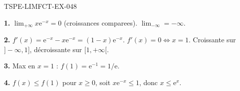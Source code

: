 \begin{corrige}{TSPE-LIMFCT-EX-048}

\textbf{1.} $\lim_{+\infty} x\mathrm{e}^{-x} = 0$ (croissances comparees). $\lim_{-\infty} = -\infty$.

\textbf{2.} $f'(x) = \mathrm{e}^{-x} - x\mathrm{e}^{-x} = (1-x)\mathrm{e}^{-x}$. $f'(x) = 0 \iff x = 1$. Croissante sur $]-\infty, 1]$, décroissante sur $[1, +\infty[$.

\textbf{3.} Max en $x = 1$ : $f(1) = \mathrm{e}^{-1} = 1/\mathrm{e}$.

\textbf{4.} $f(x) \leq f(1)$ pour $x \geq 0$, soit $x\mathrm{e}^{-x} \leq 1$, donc $x \leq \mathrm{e}^x$.

\end{corrige}
